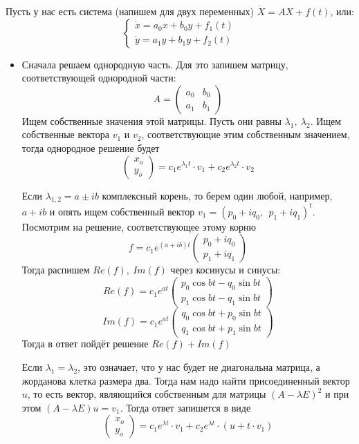 \documentclass[11pt]{article}
\begin{document}
	Пусть у нас есть система (напишем для двух переменных) $\dot{X} = AX + f(t)$, или:
	$$\begin{cases}
		\dot{x} = a_0x + b_0y + f_1(t) \\
		\dot{y} = a_1y + b_1y + f_2(t)
	\end{cases}$$
	\begin{itemize}
		\item Сначала решаем однородную часть. Для это запишем матрицу, соответствующей однородной части:
		$$A = \begin{pmatrix}
			a_0 & b_0 \\
			a_1 & b_1
		\end{pmatrix}$$
		Ищем собственные значения этой матрицы. Пусть они равны $\lambda_1, \ \lambda_2$. Ищем собственные вектора $v_1$ и $v_2$, соответствующие этим собственным 
		значением, тогда однородное решение будет
		$$\begin{pmatrix}
			x_o \\ y_o
		\end{pmatrix} = c_1e^{\lambda_1t}\cdot v_1 + c_2e^{\lambda_2t}\cdot v_2$$

		Если $\lambda_{1, 2} = a \pm ib$ комплексный корень, то берем один любой, например, $a + ib$ и опять ищем собственный вектор $v_1 = (p_0 + iq_0, \ \ p_1 + iq_1)^t$. \\
		Посмотрим на решение, соответствующее этому корню
		$$f = c_1e^{(a + ib)t} \begin{pmatrix}
			p_0 + iq_0 \\ p_1 + iq_1
		\end{pmatrix}$$
		Тогда распишем $Re(f), \ Im(f)$ через косинусы и синусы:
		$$Re(f) = c_1e^{at} \begin{pmatrix}
			p_0\cos bt - q_0 \sin bt \\
			p_1 \cos bt - q_1 \sin bt
		\end{pmatrix}$$
		$$Im(f) = c_1e^{at} \begin{pmatrix}
			q_0\cos bt + p_0 \sin bt \\
			q_1 \cos bt + p_1 \sin bt
		\end{pmatrix}$$
		Тогда в ответ пойдёт решение $Re(f) + Im(f)$

		Если $\lambda_1 = \lambda_2$, это означает, что у нас будет не диагональна матрица, а жорданова клетка размера два. Тогда
		нам надо найти присоединенный вектор $u$, то есть вектор, являющийся собственным для матрицы $(A - \lambda E)^2$ и при этом
		$(A - \lambda E)u = v_1$. Тогда ответ запишется в виде 
		$$\begin{pmatrix}
			x_o \\ y_o
		\end{pmatrix} = c_1e^{\lambda t}\cdot v_1 + c_2e^{\lambda t}\cdot (u + t \cdot v_1)$$


\end{itemize}
\end{document}
